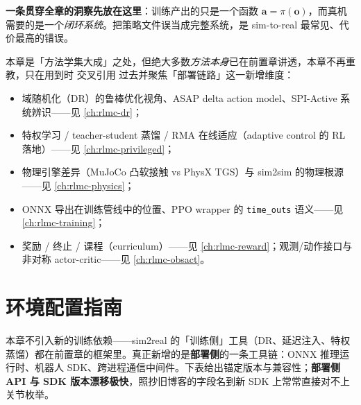 \textbf{一条贯穿全章的洞察先放在这里}：训练产出的只是一个函数 $\mathbf a=\pi(\mathbf o)$，而真机需要的是一个\emph{闭环系统}。把策略文件误当成完整系统，是 sim-to-real 最常见、代价最高的错误。

\begin{note}
本章是「方法学集大成」之处，但绝大多数\emph{方法本身}已在前置章讲透，本章不再重教，只在用到时 交叉引用 过去并聚焦「部署链路」这一新增维度：
\begin{itemize}
  \item 域随机化（DR）的鲁棒优化视角、ASAP delta action model、SPI-Active 系统辨识——见 \cref{ch:rlmc-dr}；
  \item 特权学习 / teacher-student 蒸馏 / RMA 在线适应（adaptive control 的 RL 落地）——见 \cref{ch:rlmc-privileged}；
  \item 物理引擎差异（MuJoCo 凸软接触 vs PhysX TGS）与 sim2sim 的物理根源——见 \cref{ch:rlmc-physics}；
  \item ONNX 导出在训练管线中的位置、PPO wrapper 的 \verb|time_outs| 语义——见 \cref{ch:rlmc-training}；
  \item 奖励 / 终止 / 课程（curriculum）——见 \cref{ch:rlmc-reward}；观测/动作接口与非对称 actor-critic——见 \cref{ch:rlmc-obsact}。
\end{itemize}
\end{note}

\section*{环境配置指南}
\label{sec:rlmc-s2r-env}

本章不引入新的训练依赖——sim2real 的「训练侧」工具（DR、延迟注入、特权蒸馏）都在前置章的框架里。真正新增的是\textbf{部署侧}的一条工具链：ONNX 推理运行时、机器人 SDK、跨进程通信中间件。下表给出锚定版本与兼容性；\textbf{部署侧 API 与 SDK 版本漂移极快}，照抄旧博客的字段名到新 SDK 上常常直接对不上关节枚举。

